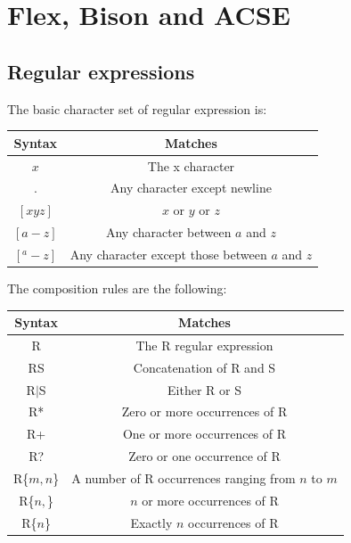 \documentclass[12pt, a4paper]{report}
\newtheorem[style=M, bodystyle=\normalfont]{operation}{Operation}
\newtheorem[style=M, bodystyle=\normalfont]{theorem}{Theorem}
\newtheorem[style=M, bodystyle=\normalfont]{corollary}{Corollary}
\newtheorem[style=M, bodystyle=\normalfont]{lemma}{Lemma}
\newtheorem[style=M, bodystyle=\normalfont]{definition}{Definition}
\begin{document}
    


\newpage 

\chapter{Flex, Bison and ACSE}
    \section{Regular expressions}
    The basic character set of regular expression is: 
    \begin{table}[H]
        \centering
        \begin{tabular}{cc}
        \hline
        \textbf{Syntax} & \textbf{Matches}                               \\ \hline
        $x$             & The x character                                \\
        $.$             & Any character except newline                   \\
        $[xyz]$         & $x$ or $y$ or $z$                              \\
        $[a-z]$         & Any character between $a$ and $z$              \\
        $[^a-z]$        & Any character except those between $a$ and $z$ \\ \hline
        \end{tabular}
    \end{table}
    The composition rules are the following: 
    \begin{table}[H]
        \centering
        \begin{tabular}{cc}
        \hline
        \textbf{Syntax} & \textbf{Matches}                                  \\ \hline
        R               & The R regular expression                          \\
        RS              & Concatenation of R and S                          \\
        R$|$S             & Either R or S                                     \\
        R*              & Zero or more occurrences of R                     \\
        R+              & One or more occurrences of R                      \\
        R?              & Zero or one occurrence of R                       \\
        R\{$m,n$\}      & A number of R occurrences ranging from $n$ to $m$ \\
        R\{$n,$\}       & $n$ or more occurrences of R                      \\
        R\{$n$\}        & Exactly $n$ occurrences of R                      \\ \hline
        \end{tabular}
    \end{table}
\end{document}

